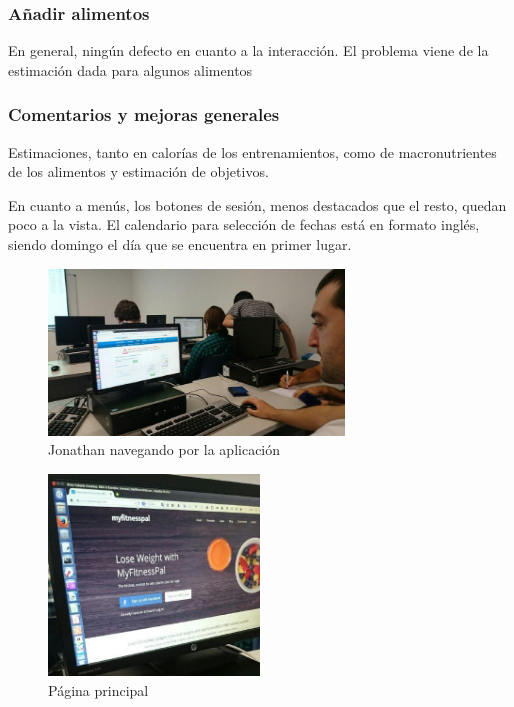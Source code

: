 \documentclass[a4paper]{article}
\begin{document}
		\subsubsection*{Añadir alimentos}
		
		En general, ningún defecto en cuanto a la interacción. El problema viene de la estimación dada para algunos alimentos
		
		\subsubsection*{Comentarios y mejoras generales}
		
		Estimaciones, tanto en calorías de los entrenamientos, como de macronutrientes de los alimentos y estimación de objetivos.
		
		En cuanto a menús, los botones de sesión, menos destacados que el resto, quedan poco a la vista. El calendario para selección de fechas está en formato inglés, siendo domingo el día que se encuentra en primer lugar.
		
			\begin{figure}[!h]
				\centering
				\includegraphics[width=0.7\textwidth]{./figuras/jonat-1.jpg}
				\caption{Jonathan navegando por la aplicación}
			\end{figure} 
		
			\begin{figure}[!h]
				\centering
				\includegraphics[width=0.5\textwidth]{./figuras/jonat-2.jpg}
				\caption{Página principal}
			\end{figure} 
			
\end{document}
